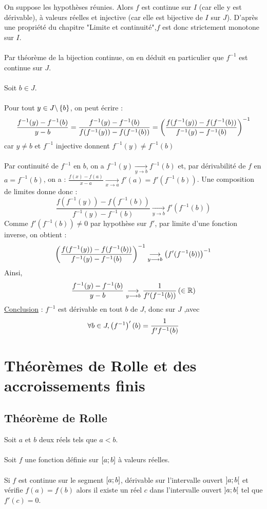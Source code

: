 \begin{dem}
    On suppose les hypothèses réunies. Alors \(f\) est continue sur \(I\) (car elle y est dérivable), à valeurs réelles et injective (car elle est bijective de \(I\) sur \(J\)). D’après une propriété du chapitre "Limite et continuité",\(f\) est donc strictement monotone sur \(I\).\\~\\
    Par théorème de la bijection continue, on en déduit en particulier que \(f^{-1}\) est continue sur \(J\).\\~\\
    Soit \(b \in J\).\\~\\
    Pour tout \(y \in J\backslash \left\lbrace b\right\rbrace\), on peut écrire :
    \[\frac{f^{-1}(y)-f^{-1}(b)}{y-b} = \frac{f^{-1}(y) - f^{-1}(b)}{f(f^{-1}(y))-f(f^{-1}(b))} = \left(\frac{f(f^{-1}(y))-f(f^{-1}(b))}{f^{-1}(y) - f^{-1}(b)}\right)^{-1}\]
    car \(y \neq b \) et \(f^{-1}\) injective donnent \(f^{-1}(y) \neq f^{-1}(b)\)\\~\\
    Par continuité de \(f^{-1}\) en \(b\), on a \(f^{-1}(y) \underset{y \to b}{\to} f^{-1}(b)\) et, par dérivabilité de \(f\) en \(a = f^{-1}(b)\), on a : 
    \(\frac{f(x)-f(a)}{x-a} \underset{x \to a}{\to} f'(a) = f'(f^{-1}(b))\). Une composition de limites donne donc :
    \[\frac{f(f^{-1}(y))-f(f^{-1}(b))}{f^{-1}(y) - f^{-1}(b)} \underset{y \to b}{\to} f'(f^{-1}(b))\]
    Comme \(f'(f^{-1}(b))\neq 0 \) par hypothèse sur \(f'\), par limite d'une fonction inverse, on obtient : 
    \[\left(\frac{f(f^{-1}(y))-f(f^{-1}(b))}{f^{-1}(y) - f^{-1}(b)}\right)^{-1} \underset{y \longrightarrow b}{\longrightarrow} \left(f'(f^{-1}(b))\right)^{-1}\]
    Ainsi,
    \[\frac{f^{-1}(y)-f^{-1}(b)}{y-b} \underset{y \longrightarrow b}{\longrightarrow} \frac{1}{f'(f^{-1}(b))} \left( \in \mathbb{R}\right)\]
    \underline{Conclusion} : \(f^{-1}\) est dérivable en tout \(b\) de \(J\), donc sur \(J\) ,avec 
    \[\forall b \in J,\left(f^{-1}\right)'(b) = \frac{1}{f'f^{-1}(b)}\]
\end{dem}

\section{Théorèmes de Rolle et des accroissements finis}
\subsection{Théorème de Rolle}
\begin{theo}
    Soit \(a\) et \(b\) deux réels tels que \(a < b\).\\~\\
    Soit \(f\) une fonction définie sur \(\left[a;b\right]\) à valeurs réelles.\\~\\
    Si \(f\) est continue sur le segment \(\left[a;b\right]\), dérivable sur l’intervalle ouvert \(\left]a;b\right[\) et vérifie \(f (a) = f (b)\) alors il existe un réel \(c\) dans l’intervalle ouvert \(\left]a;b\right[\) tel que \(f '(c) = 0\).
\end{theo}

